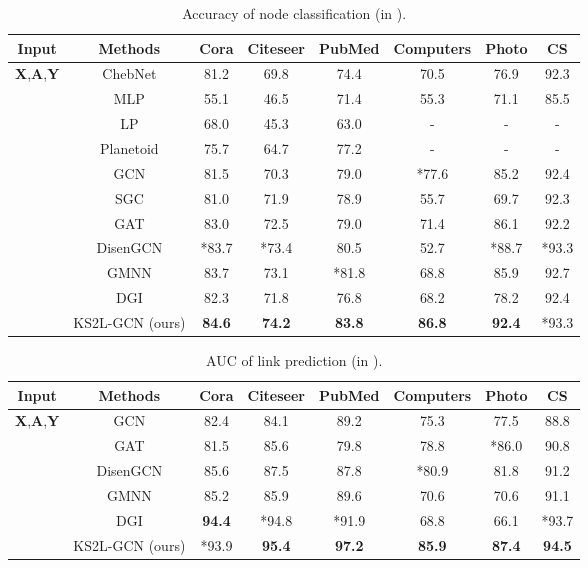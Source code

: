 \documentclass[preprint]{article}
\begin{document}
\begin{table}[!tp]
\caption{Accuracy of node classification (in ).}
\label{result:node:clf}
\centering
\footnotesize
\begin{tabular}{c c c c c c c c}
\toprule
	\textbf{Input} &\textbf{Methods} & \textbf{Cora} & \textbf{Citeseer} & \textbf{PubMed} & \textbf{Computers} & \textbf{Photo} & \textbf{CS}\\
\midrule
	\multirow{10}{*}{\textbf{X},\textbf{A},\textbf{Y}} &ChebNet & 81.2 & 69.8 & 74.4 & 70.5 & 76.9 & 92.3\\
	&MLP & 55.1 & 46.5 & 71.4 & 55.3 & 71.1 & 85.5\\
    &LP & 68.0 & 45.3 & 63.0 & - & - & - \\
	&Planetoid & 75.7 & 64.7 & 77.2 & - & - & -\\
	&GCN & 81.5 & 70.3 & 79.0 & *77.6 & 85.2 & 92.4\\
	&SGC & 81.0 & 71.9 & 78.9 & 55.7 & 69.7 & 92.3\\
	&GAT & 83.0 & 72.5 & 79.0 & 71.4 & 86.1 & 92.2\\
	&DisenGCN & *83.7 & *73.4 & 80.5 & 52.7 & *88.7 & *93.3\\
	&GMNN & 83.7 & 73.1 & *81.8 & 68.8 & 85.9 & 92.7\\
\midrule
	\multirow{2}{*}{\textbf{X},\textbf{A}} &DGI & 82.3 & 71.8 & 76.8 & 68.2 & 78.2 & 92.4\\
	& KS2L-GCN (ours) & \textbf{84.6} & \textbf{74.2} & \textbf{83.8}&\textbf{86.8} & \textbf{92.4} & *93.3\\
\bottomrule
\end{tabular}
\end{table}

\begin{table}[!tp]
\caption{AUC of link prediction (in ).}
\label{result:link:clf}
\centering
\footnotesize
\begin{tabular}{c c c c c c c c}
\toprule
	\textbf{Input} &\textbf{Methods} & \textbf{Cora} & \textbf{Citeseer} & \textbf{PubMed} & \textbf{Computers} & \textbf{Photo} & \textbf{CS}\\
\midrule
	\multirow{5}{*}{\textbf{X},\textbf{A},\textbf{Y}}
	&GCN & 82.4 & 84.1 & 89.2 & 75.3 & 77.5 & 88.8\\
	&GAT & 81.5 & 85.6 & 79.8 & 78.8 & *86.0 & 90.8\\
	&DisenGCN & 85.6 & 87.5 & 87.8 & *80.9 & 81.8 & 91.2\\
	&GMNN & 85.2 & 85.9 & 89.6 & 70.6 & 70.6 & 91.1\\
\midrule
	\multirow{2}{*}{\textbf{X},\textbf{A}}
	&DGI & \textbf{94.4} & *94.8 & *91.9 & 68.8 & 66.1 & *93.7\\
	& KS2L-GCN (ours) & *93.9 & \textbf{95.4} & \textbf{97.2}& \textbf{85.9} & \textbf{87.4} & \textbf{94.5}\\
\bottomrule
\end{tabular}
\end{table}
\end{document}
